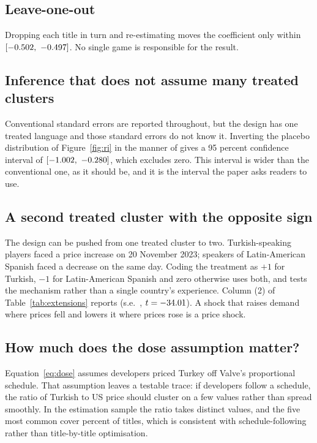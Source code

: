 \documentclass[11pt]{article}
\begin{document}
\subsection{Leave-one-out}

Dropping each title in turn and re-estimating moves the coefficient only within
$[-0.502,\ -0.497]$. No single game is responsible for the result.

\subsection{Inference that does not assume many treated clusters}

Conventional standard errors are reported throughout, but the design has one treated language and
those standard errors do not know it. Inverting the placebo distribution of
Figure~\ref{fig:ri} in the manner of \citet{conley2011} gives a 95 percent confidence interval of
$[\ctLo,\ \ctHi]$, which excludes zero. This interval is wider than the conventional one, as it
should be, and it is the interval the paper asks readers to use.

\subsection{A second treated cluster with the opposite sign}

The design can be pushed from one treated cluster to two. Turkish-speaking players faced a price
increase on 20 November 2023; speakers of Latin-American Spanish faced a decrease on the same day.
Coding the treatment as $+1$ for Turkish, $-1$ for Latin-American Spanish and zero otherwise uses
both, and tests the mechanism rather than a single country's experience. Column (2) of
Table~\ref{tab:extensions} reports \bSigned{} (s.e.\ \seSigned, $t = -34.01$). A shock that
raises demand where prices fell and lowers it where prices rose is a price shock.

\subsection{How much does the dose assumption matter?}

Equation~\eqref{eq:dose} assumes developers priced Turkey off Valve's proportional schedule. That
assumption leaves a testable trace: if developers follow a schedule, the ratio of Turkish to US
price should cluster on a few values rather than spread smoothly. In the estimation sample the
ratio takes \nRatioModes{} distinct values, and the five most common cover \topFiveShare{} percent
of titles, which is consistent with schedule-following rather than title-by-title optimisation.
\end{document}
